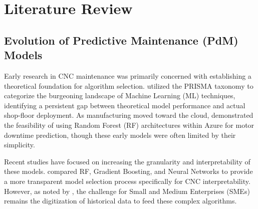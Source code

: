 \chapter{Literature Review} %

\label{Chapter 2}


\section{Evolution of Predictive Maintenance (PdM) Models}
Early research in CNC maintenance was primarily concerned with establishing a theoretical foundation for algorithm selection. \cite{cinar2020mlpdm} utilized the PRISMA taxonomy to categorize the burgeoning landscape of Machine Learning (ML) techniques, identifying a persistent gap between theoretical model performance and actual shop-floor deployment. As manufacturing moved toward the cloud, \cite{paolanti2018mlindustry4} demonstrated the feasibility of using Random Forest (RF) architectures within Azure for motor downtime prediction, though these early models were often limited by their simplicity. 

Recent studies have focused on increasing the granularity and interpretability of these models. \cite{wakhare2023optimizing} compared RF, Gradient Boosting, and Neural Networks to provide a more transparent model selection process specifically for CNC interpretability. However, as noted by \cite{sarikaya2024predictive}, the challenge for Small and Medium Enterprises (SMEs) remains the digitization of historical data to feed these complex algorithms.


